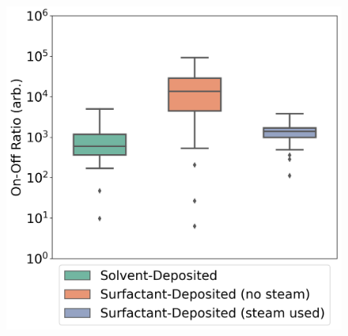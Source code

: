 \documentclass[
  a4paper,
]{scrbook}
\begin{document}
\begin{figure}
\begin{minipage}[t]{0.45\linewidth}
{{\includegraphics{figures/ch5/onoff_CNT.png}

}

}

\end{minipage}%
%
\begin{minipage}[t]{0.01\linewidth}

{\centering 

~

}

\end{minipage}%
%
\begin{minipage}[t]{0.03\linewidth}

{\centering 


}

\end{minipage}%
%
\begin{minipage}[t]{0.01\linewidth}

{\centering 

}
\end{minipage}
\end{figure}
\end{document}
